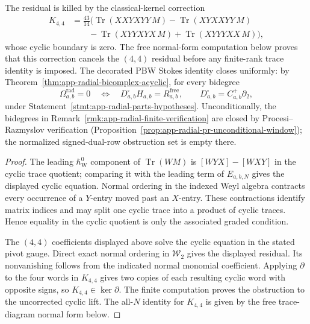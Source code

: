 \begin{stmt}
  The residual is killed by the classical-kernel correction
  \[
  \begin{aligned}
    K_{4,4}
    &=
    \frac{43}{14}\bigl(
      \operatorname{Tr}(XXYXYY\,M)
      -\operatorname{Tr}(XYXXYY\,M)
      \\
    &\qquad
      -\operatorname{Tr}(XYYXYX\,M)
      +\operatorname{Tr}(XYYYXX\,M)
    \bigr),
  \end{aligned}
  \]
  whose cyclic boundary is zero.  The free normal-form computation below
  proves that this correction cancels the \((4,4)\) residual before any
  finite-rank trace identity is imposed.  The decorated PBW Stokes
  identity closes uniformly: by
  Theorem~\ref{thm:app-radial-bicomplex-acyclic}, for every bidegree
  \[
    \Omega^{\mathrm{rad}}_{a,b}=0
    \quad\Longleftrightarrow\quad
    D^\square_{a,b}H_{a,b}=R^{\mathrm{free}}_{a,b},
    \qquad
    D^\square_{a,b}=C^+_{a,b}\partial_2 ,
  \]
  under Statement~\ref{stmt:app-radial-parts-hypotheses}.
  Unconditionally, the
  bidegrees in Remark~\ref{rmk:app-radial-finite-verification} are
  closed by Procesi--Razmyslov verification
  (Proposition~\ref{prop:app-radial-pr-unconditional-window}); the
  normalized signed-dual-row obstruction set is empty there.
\end{stmt}

\begin{proof}
  The leading \(\hbar_{\mathrm{W}}^0\) component of
  \(\operatorname{Tr}(W M)\) is
  \([WYX]-[WXY]\) in the cyclic trace quotient; comparing it with the
  leading term of \(E_{a,b,N}\) gives the displayed cyclic equation.
  Normal ordering in the indexed Weyl algebra contracts every occurrence
  of a \(Y\)-entry moved past an \(X\)-entry.  These contractions identify
  matrix indices and may split one cyclic trace into a product of cyclic
  traces.  Hence equality in the cyclic quotient is only the associated
  graded condition.

  The \((4,4)\) coefficients displayed above solve the cyclic equation
  in the stated pivot gauge.  Direct exact normal ordering in
  \(\mathcal W_2\) gives the displayed residual.  Its nonvanishing follows
  from the indicated normal monomial coefficient.  Applying \(\partial\)
  to the four words in \(K_{4,4}\) gives two copies of each resulting
  cyclic word with opposite signs, so \(K_{4,4}\in\ker\partial\).  The
  finite computation proves the obstruction to the uncorrected cyclic
  lift.  The all-\(N\) identity for \(K_{4,4}\) is given by the free
  trace-diagram normal form below.
\end{proof}

